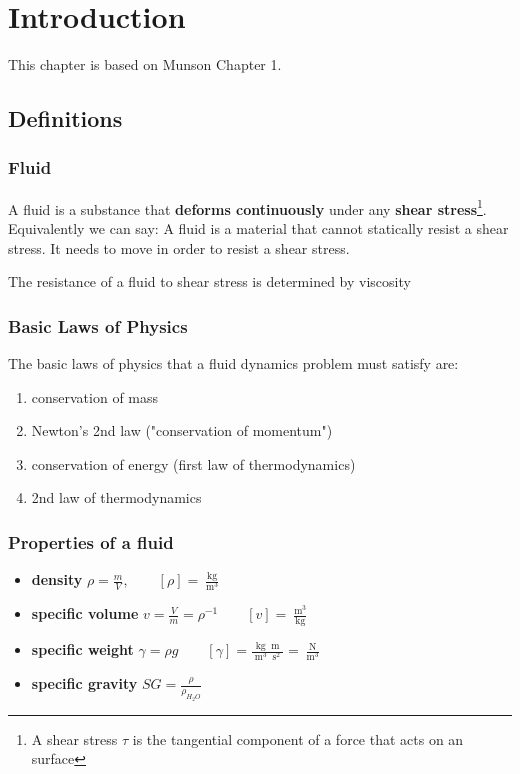 \chapter{Introduction}

This chapter is based on Munson Chapter 1.
\section{Definitions}
\subsection{Fluid}
A fluid is a substance that \textbf{deforms continuously} under any \textbf{shear stress}\footnote{A shear stress $\tau$ is the tangential component of a force that acts on an surface}. Equivalently we can say: A fluid is a material that cannot statically resist a shear stress. It needs to move in order to resist a shear stress.

The resistance of a fluid to shear stress is determined by viscosity

\subsection{Basic Laws of Physics}
The basic laws of physics that a fluid dynamics problem must satisfy are:
\begin{enumerate}
    \item conservation of mass
    \item Newton's 2nd law  ("conservation of momentum")
    \item conservation of energy (first law of thermodynamics)
    \item 2nd law of thermodynamics
\end{enumerate}

\subsection{Properties of a fluid}
\begin{itemize}
    \item \textbf{density} $\rho=\frac mV,\qquad [\rho]=\frac {\operatorname{kg}}{\operatorname{m}^3}$
    \item \textbf{specific volume} $v=\frac Vm=\rho^{-1}\qquad [v]  =\frac {\operatorname{m}^3}{\operatorname{kg}}$
    \item \textbf{specific weight} $\gamma=\rho g\qquad [\gamma]=\frac{\operatorname{kg}\operatorname{m}}{\operatorname{m}^3\operatorname{s}^2}=\frac{\operatorname{N}}{\operatorname{m}^3}$
    \item \textbf{specific gravity} $SG=\frac{\rho}{\rho_{H_2O}}$
\end{itemize}
